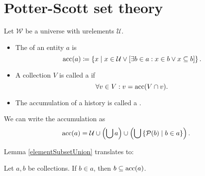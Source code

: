 \section{Potter-Scott set theory}
\begin{definition}
Let $\mathcal{W}$ be a universe with urelements $\mathcal{U}$.
\begin{itemize}
\item The  of an entity $a$ is
\[ \operatorname{acc}(a) \coloneqq \left\{ x \;\middle|\; x\in \mathcal{U} \lor \left[\exists b\in a: x\in b \lor x\subseteq b\right] \right\}. \]
\item A collection $V$ is called a  if
\[ \forall v\in V: v = \operatorname{acc}(V\cap v). \]
\item The accumulation of a history is called a .
\end{itemize}
\end{definition}

We can write the accumulation as
\[ \operatorname{acc}(a) = \mathcal{U}\cup \left(\bigcup a\right) \cup \left(\bigcup\left\{ \operatorname{\mathcal{P}}(b) \;\middle|\; b\in a \right\}\right). \]

Lemma \ref{elementSubsetUnion} translates to:
\begin{lemma} \label{elementsSubsetAccumulation}
Let $a,b$ be collections. If $b\in a$, then $b\subseteq \operatorname{acc}(a)$.
\end{lemma}

